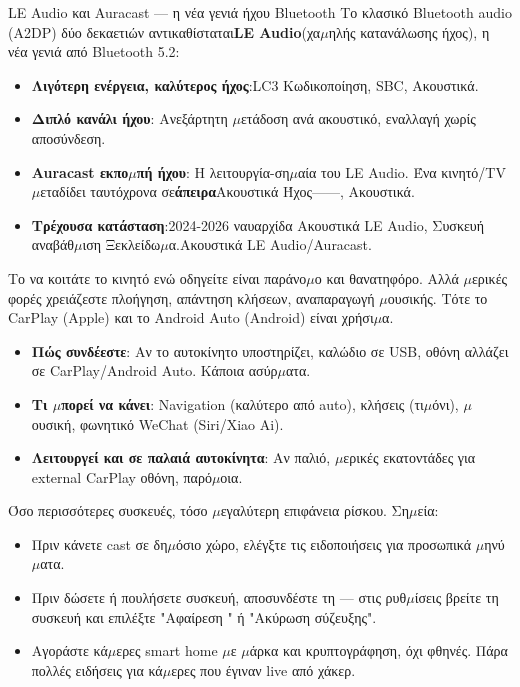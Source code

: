 \begin{tcbinfo}{LE Audio και Auracast — η νέα γενιά ήχου Bluetooth}
Το κλασικό Bluetooth audio (A2DP) δύο δεκαετιών αντικαθίσταται\textbf{LE Audio}(χα$\mu$ηλής κατανάλωσης ήχος), η νέα γενιά από Bluetooth 5.2:

\begin{itemize}
  \item \textbf{Λιγότερη ενέργεια, καλύτερος ήχος}:LC3 Κωδικοποίηση, SBC, Ακουστικά.
  \item \textbf{Διπλό κανάλι ήχου}: Ανεξάρτητη $\mu$ετάδοση ανά ακουστικό, εναλλαγή χωρίς αποσύνδεση.
  \item \textbf{Auracast εκπο$\mu$πή ήχου}: Η λειτουργία-ση$\mu$αία του LE Audio. Ένα κινητό/TV $\mu$εταδίδει ταυτόχρονα σε\textbf{άπειρα}Ακουστικά Ήχος——, Ακουστικά.
  \item \textbf{Τρέχουσα κατάσταση}:2024-2026 ναυαρχίδα Ακουστικά LE Audio, Συσκευή αναβάθ$\mu$ιση Ξεκλείδω$\mu$α.Ακουστικά LE Audio/Auracast.
\end{itemize}

\end{tcbinfo}


Το να κοιτάτε το κινητό ενώ οδηγείτε είναι παράνο$\mu$ο και θανατηφόρο. Αλλά $\mu$ερικές φορές χρειάζεστε πλοήγηση, απάντηση κλήσεων, αναπαραγωγή $\mu$ουσικής. Τότε το CarPlay (Apple) και το Android Auto (Android) είναι χρήσι$\mu$α.

\begin{itemize}
  \item \textbf{Πώς συνδέεστε}: Αν το αυτοκίνητο υποστηρίζει, καλώδιο σε USB, οθόνη αλλάζει σε CarPlay/Android Auto. Κάποια ασύρ$\mu$ατα.
  \item \textbf{Τι $\mu$πορεί να κάνει}: Navigation (καλύτερο από auto), κλήσεις (τι$\mu$όνι), $\mu$ουσική, φωνητικό WeChat (Siri/Xiao Ai).
  \item \textbf{Λειτουργεί και σε παλαιά αυτοκίνητα}: Αν παλιό, $\mu$ερικές εκατοντάδες για external CarPlay οθόνη, παρό$\mu$οια.
\end{itemize}


Όσο περισσότερες συσκευές, τόσο $\mu$εγαλύτερη επιφάνεια ρίσκου. Ση$\mu$εία:

\begin{itemize}
  \item Πριν κάνετε cast σε δη$\mu$όσιο χώρο, ελέγξτε τις ειδοποιήσεις για προσωπικά $\mu$ηνύ$\mu$ατα.
  \item Πριν δώσετε ή πουλήσετε συσκευή, αποσυνδέστε τη — στις ρυθ$\mu$ίσεις βρείτε τη συσκευή και επιλέξτε "Αφαίρεση " ή "Ακύρωση σύζευξης".
  \item Αγοράστε κά$\mu$ερες smart home $\mu$ε $\mu$άρκα και κρυπτογράφηση, όχι φθηνές. Πάρα πολλές ειδήσεις για κά$\mu$ερες που έγιναν live από χάκερ.
\end{itemize}

